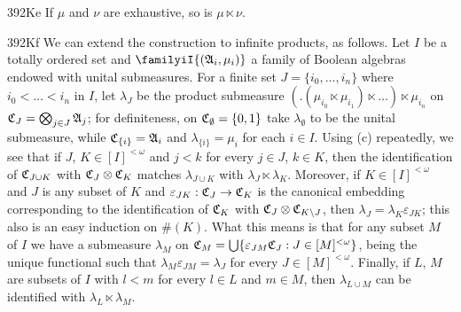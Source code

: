 \spheader 392Ke If $\mu$ and $\nu$ are exhaustive, so is
$\mu\ltimes\nu$.   

\spheader 392Kf We can extend the construction to infinite products, as
follows.   Let $I$ be a totally ordered set and
$\familyiI{(\frak A_i,\mu_i)}$ a family of Boolean
algebras endowed with unital submeasures.   For a finite set
$J=\{i_0,\ldots,i_n\}$ where $i_0<\ldots<i_n$ in $I$, let $\lambda_J$
be the product submeasure
$(.(\mu_{i_0}\ltimes\mu_{i_1})\ltimes\ldots)\ltimes\mu_{i_n}$ on
$\frak C_J=\bigotimes_{j\in J}\frak A_j$;  for definiteness, on
$\frak C_{\emptyset}=\{0,1\}$
take $\lambda_{\emptyset}$ to be the unital submeasure, while
$\frak C_{\{i\}}=\frak A_i$ and $\lambda_{\{i\}}=\mu_i$ for each $i\in I$.
Using (c) repeatedly, we see that if $J$, $K\in[I]^{<\omega}$ and
$j<k$ for every $j\in J$,
$k\in K$, then the identification of $\frak C_{J\cup K}$ with
$\frak C_J\otimes\frak C_K$ matches $\lambda_{J\cup K}$
with $\lambda_J\ltimes\lambda_K$.
Moreover, if $K\in[I]^{<\omega}$ and $J$ is any subset of $K$ and
$\varepsilon_{JK}:\frak C_J\to\frak C_K$ is the canonical embedding
corresponding to the identification of $\frak C_K$ with
$\frak C_J\otimes\frak C_{K\setminus J}$, then
$\lambda_J=\lambda_K\varepsilon_{JK}$;  this also is an easy
induction on $\#(K)$.   What this means is that for any subset $M$ of
$I$ we have a submeasure $\lambda_M$ on
$\frak C_M=\bigcup\{\varepsilon_{JM}\frak C_J:J\in[M]^{<\omega}\}$,
being the unique functional such that
$\lambda_M\varepsilon_{JM}=\lambda_J$ for every
$J\in[M]^{<\omega}$.   Finally, if
$L$, $M$ are subsets of $I$ with $l<m$ for every $l\in L$ and
$m\in M$, then $\lambda_{L\cup M}$ can be identified with
$\lambda_L\ltimes\lambda_M$.

